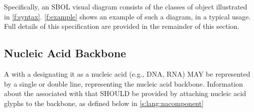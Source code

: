 Specifically, an SBOL visual diagram consists of the classes of object illustrated in \ref{f:syntax}.
\ref{f:example} shows an example of such a diagram, in a typical usage.
Full details of this specification are provided in the remainder of this section.


\subsection{Nucleic Acid Backbone}
\label{s:lang:backbone}

A  with a  designating it as a nucleic acid (e.g., DNA, RNA) MAY be represented by a single or double line, representing the nucleic acid backbone. 
Information about the  associated with that  SHOULD be provided by attaching nucleic acid glyphs to the backbone, as defined below in \ref{s:lang:nacomponent}

